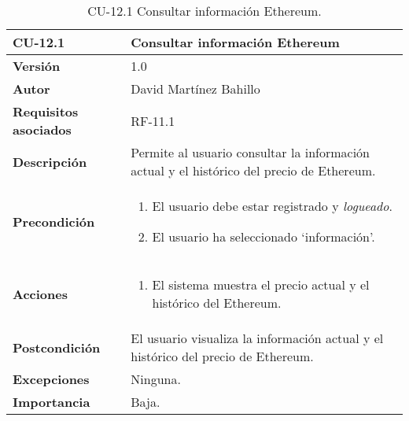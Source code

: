 \begin{table}[p]
	\centering
	\begin{tabularx}{\linewidth}{ p{} p{} }
		\toprule
		\textbf{CU-12.1}  & \textbf{Consultar información Ethereum}\\
		\midrule
		\textbf{Versión}              & 1.0    \\
		\textbf{Autor}                & David Martínez Bahillo \\
		\textbf{Requisitos asociados} & RF-11.1 \\
		\textbf{Descripción}          & Permite al usuario consultar la información actual y el histórico del precio de Ethereum. \\
		\textbf{Precondición}         &  
		\begin{enumerate}
			\item El usuario debe estar registrado y \textit{logueado}.
			\item El usuario ha seleccionado `información'.
		\end{enumerate}\\
		\textbf{Acciones}             &
		\begin{enumerate}
			\item El sistema muestra el precio actual y el histórico del Ethereum.
		\end{enumerate}\\
		\textbf{Postcondición}        & El usuario visualiza la información actual y el histórico del precio de Ethereum. \\
		\textbf{Excepciones}          & Ninguna. \\
		\textbf{Importancia}          & Baja. \\
		\bottomrule
	\end{tabularx}
	\caption{CU-12.1 Consultar información Ethereum.}
\end{table}



